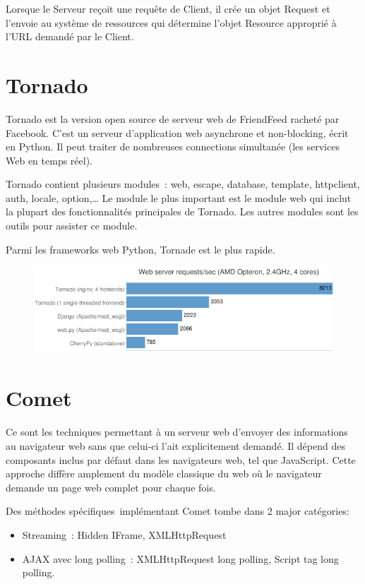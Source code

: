 \documentclass[a4paper,10pt]{report}
\begin{document}
Lorsque le Serveur reçoit une requête de Client, il crée un objet Request et l’envoie au système de ressources qui détermine l’objet Resource approprié à l’URL demandé par le Client.

  \section{Tornado}
Tornado est la version open source de serveur web de FriendFeed racheté par Facebook. C’est un serveur d’application web asynchrone et non-blocking,  écrit en Python. Il peut traiter de nombreuses connections simultanée (les services Web en temps réel).


Tornado contient plusieurs modules : web, escape, database, template, httpclient, auth, locale, option,… Le module le plus important est le module web qui inclut la plupart des fonctionnalités principales de Tornado. Les autres modules sont les outils pour assister ce module.


Parmi les frameworks web Python, Tornade est le plus rapide.
\begin{figure}[!ht]
  \centering
  \includegraphics[scale=0.7, bb=0 0 601 175]{img/Tornado.png} 
\end{figure} 

  \section{Comet}
Ce sont les techniques permettant à un serveur web d'envoyer des informations au navigateur web sans que celui-ci l'ait explicitement demandé.  Il dépend des composants inclus par défaut dans les navigateurs web, tel que JavaScript. Cette approche diffère amplement du modèle classique du web où le navigateur demande un page web complet pour chaque fois.

Des méthodes spécifiques implémentant Comet tombe dans 2 major catégories:
\begin{itemize}
\item Streaming : Hidden IFrame, XMLHttpRequest
\item AJAX avec long polling : XMLHttpRequest long polling, Script tag long polling.
\end{itemize}
\end{document}
